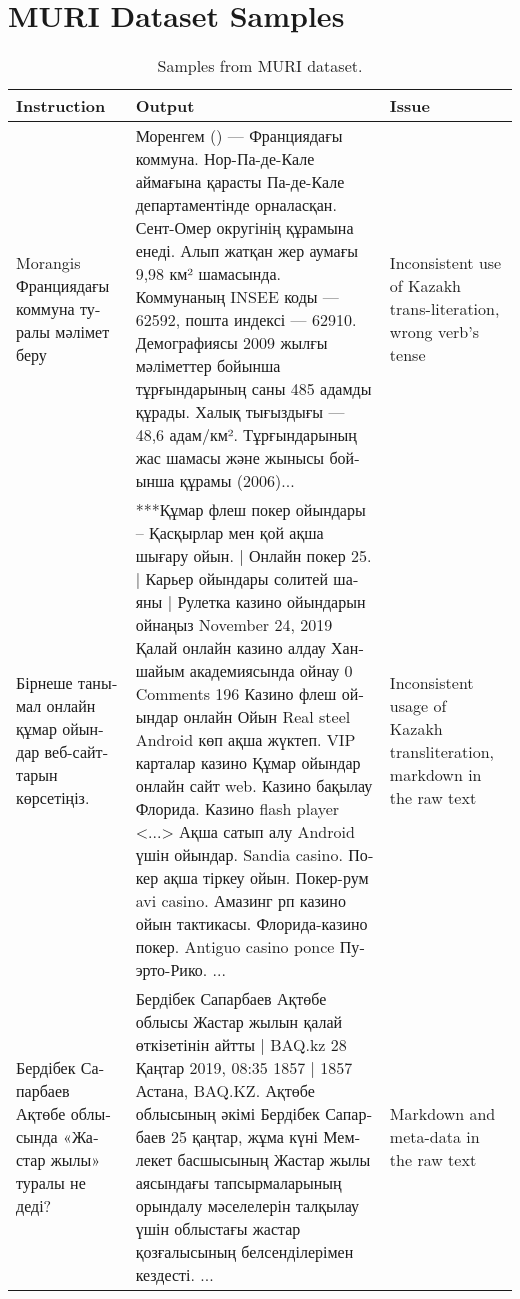 \section{MURI Dataset Samples}
\label{appx:muri}
\begin{table*}[ht!]
    
    \centering
    \begin{tabular}{|p{5cm}|p{5cm}|p{5cm}|}
        \hline
        \textbf{Instruction} & \textbf{Output} & \textbf{Issue} \\
        \hline
        \foreignlanguage{russian}{Morangis Франциядағы коммуна туралы мәлімет беру} & \foreignlanguage{russian}{Моренгем () — Франциядағы коммуна. Нор-Па-де-Кале аймағына қарасты Па-де-Кале департаментінде орналасқан. Сент-Омер округінің құрамына енеді. Алып жатқан жер аумағы 9,98 км² шамасында. Коммунаның INSEE коды — 62592, пошта индексі — 62910. Демографиясы 2009 жылғы мәліметтер бойынша тұрғындарының саны 485 адамды құрады. Халық тығыздығы — 48,6 адам/км². Тұрғындарының жас шамасы және жынысы бойынша құрамы (2006)...} &\foreignlanguage{russian}{Inconsistent use of Kazakh trans-literation, wrong verb's tense } \\
        \hline
        \foreignlanguage{russian}{Бірнеше танымал онлайн құмар ойындар веб-сайттарын көрсетіңіз.} &
        \foreignlanguage{russian}{***Құмар флеш покер ойындары – Қасқырлар мен қой ақша шығару ойын. | Онлайн покер 25. | Карьер ойындары солитей шаяны | Рулетка казино ойындарын ойнаңыз November 24, 2019 Қалай онлайн казино алдау Ханшайым академиясында ойнау 0 Comments 196 Казино флеш ойындар онлайн Ойын Real steel Android көп ақша жүктеп. VIP карталар казино Құмар ойындар онлайн сайт web. Казино бақылау Флорида. Казино flash player <...> Ақша сатып алу Android үшін ойындар. Sandia casino. Покер ақша тіркеу ойын. Покер-рум avi casino. Амазинг рп казино ойын тактикасы. Флорида-казино покер. Antiguo casino ponce Пуэрто-Рико. ...} &
        Inconsistent usage of Kazakh transliteration, markdown in the raw text\\
        \hline
        \foreignlanguage{russian}{Бердібек Сапарбаев Ақтөбе облысында «Жастар жылы» туралы не деді?} & 
        \foreignlanguage{russian}{Бердібек Сапарбаев Ақтөбе облысы Жастар жылын қалай өткізетінін айтты | BAQ.kz 28 Қаңтар 2019, 08:35 1857 | 1857 Астана, BAQ.KZ. Ақтөбе облысының әкімі Бердібек Сапарбаев 25 қаңтар, жұма күні Мемлекет басшысының Жастар жылы аясындағы тапсырмаларының орындалу мәселелерін талқылау үшін облыстағы жастар қозғалысының белсенділерімен кездесті.  ...} &
        Markdown and meta-data in the raw text \\
        \hline
    \end{tabular}
    \caption{Samples from MURI dataset.}
    \label{tab:muri_samples}
\end{table*}
\clearpage
